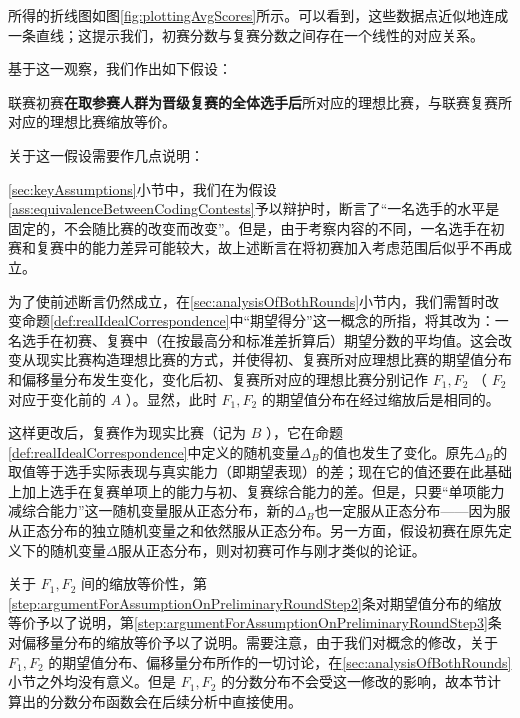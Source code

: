             所得的折线图如图\ref{fig:plottingAvgScores}所示。可以看到，这些数据点近似地连成一条直线；这提示我们，初赛分数与复赛分数之间存在一个线性的对应关系。
            
            基于这一观察，我们作出如下假设：

            \begin{assumption}
                联赛初赛\textbf{在取参赛人群为晋级复赛的全体选手后}所对应的理想比赛，与联赛复赛所对应的理想比赛缩放等价。

                \label{ass:equivalenceBetweenTwoRounds}
            \end{assumption}

            关于这一假设需要作几点说明：
            \begin{asparaenum}
                \item \ref{sec:keyAssumptions}小节中，我们在为假设\ref{ass:equivalenceBetweenCodingContests}予以辩护时，断言了“一名选手的水平是固定的，不会随比赛的改变而改变”。但是，由于考察内容的不同，一名选手在初赛和复赛中的能力差异可能较大，故上述断言在将初赛加入考虑范围后似乎不再成立。
                \item \label{step:argumentForAssumptionOnPreliminaryRoundStep2} 为了使前述断言仍然成立，在\ref{sec:analysisOfBothRounds}小节内，我们需暂时改变命题\ref{def:realIdealCorrespondence}中“期望得分”这一概念的所指，将其改为：一名选手在初赛、复赛中（在按最高分和标准差折算后）期望分数的平均值。这会改变从现实比赛构造理想比赛的方式，并使得初、复赛所对应理想比赛的期望值分布和偏移量分布发生变化，变化后初、复赛所对应的理想比赛分别记作 $F_1,F_2$ （ $F_2$ 对应于变化前的 $A$ ）。显然，此时 $F_1,F_2$ 的期望值分布在经过缩放后是相同的。
                \item \label{step:argumentForAssumptionOnPreliminaryRoundStep3} 这样更改后，复赛作为现实比赛（记为 $B$ ），它在命题\ref{def:realIdealCorrespondence}中定义的随机变量$\Delta_B$的值也发生了变化。原先$\Delta_B$的取值等于选手实际表现与真实能力（即期望表现）的差；现在它的值还要在此基础上加上选手在复赛单项上的能力与初、复赛综合能力的差。但是，只要“单项能力减综合能力”这一随机变量服从正态分布，新的$\Delta_B$也一定服从正态分布——因为服从正态分布的独立随机变量之和依然服从正态分布。另一方面，假设初赛在原先定义下的随机变量$\Delta$服从正态分布，则对初赛可作与刚才类似的论证。
                \item 关于 $F_1,F_2$ 间的缩放等价性，第\ref{step:argumentForAssumptionOnPreliminaryRoundStep2}条对期望值分布的缩放等价予以了说明，第\ref{step:argumentForAssumptionOnPreliminaryRoundStep3}条对偏移量分布的缩放等价予以了说明。需要注意，由于我们对概念的修改，关于 $F_1,F_2$ 的期望值分布、偏移量分布所作的一切讨论，在\ref{sec:analysisOfBothRounds}小节之外均没有意义。但是 $F_1,F_2$ 的分数分布不会受这一修改的影响，故本节计算出的分数分布函数会在后续分析中直接使用。
            \end{asparaenum}

